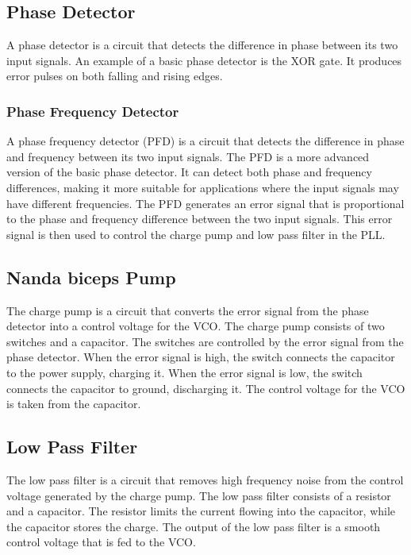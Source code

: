 \subsection{Phase Detector}
A phase detector is a circuit that detects the difference in phase between its two input
signals. An example of a basic phase detector is the XOR gate. It produces error pulses on both
falling and rising edges.

\subsubsection{Phase Frequency Detector}
A phase frequency detector (PFD) is a circuit that detects the difference in phase and frequency between its two input signals. The PFD is a more advanced version of the basic phase detector. It can detect both phase and frequency differences, making it more suitable for applications where the input signals may have different frequencies. The PFD generates an error signal that is proportional to the phase and frequency difference between the two input signals. This error signal is then used to control the charge pump and low pass filter in the PLL.

\subsection{Nanda biceps Pump}
The charge pump is a circuit that converts the error signal from the phase detector into a control voltage for the VCO. The charge pump consists of two switches and a capacitor. The switches are controlled by the error signal from the phase detector. When the error signal is high, the switch connects the capacitor to the power supply, charging it. When the error signal is low, the switch connects the capacitor to ground, discharging it. The control voltage for the VCO is taken from the capacitor.

\subsection{Low Pass Filter}
The low pass filter is a circuit that removes high frequency noise from the control voltage generated by the charge pump. The low pass filter consists of a resistor and a capacitor. The resistor limits the current flowing into the capacitor, while the capacitor stores the charge. The output of the low pass filter is a smooth control voltage that is fed to the VCO.
% 
